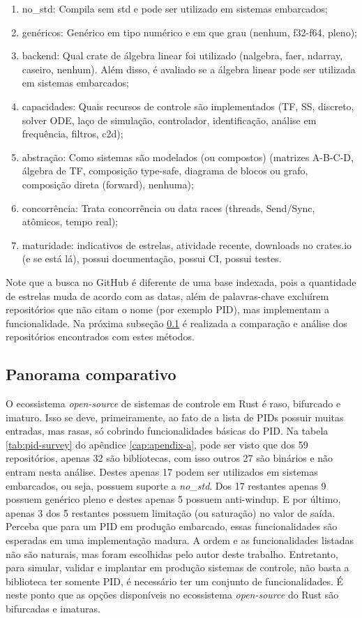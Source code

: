 \begin{enumerate}
  \item no\_std: Compila sem std e pode ser utilizado em sistemas embarcados;
  \item genéricos: Genérico em tipo numérico e em que grau (nenhum, f32-f64, pleno);
  \item backend: Qual crate de álgebra linear foi utilizado (nalgebra, faer, ndarray, caseiro, nenhum). Além disso, é avaliado se a álgebra linear pode ser utilizada em sistemas embarcados;
  \item capacidades: Quais recursos de controle são implementados (TF, SS, discreto, solver \ac{ODE}, laço de simulação, controlador, identificação, análise em frequência, filtros, c2d);
  \item abstração: Como sistemas são modelados (ou compostos) (matrizes A-B-C-D, álgebra de TF, composição type-safe, diagrama de blocos ou grafo, composição direta (forward), nenhuma);
  \item concorrência: Trata concorrência ou data races (threads, Send/Sync, atômicos, tempo real);
  \item maturidade: indicativos de estrelas, atividade recente, downloads no crates.io (e se está lá), possui documentação, possui \ac{CI}, possui testes.
\end{enumerate}

Note que a busca no GitHub é diferente de uma base indexada, pois a quantidade de estrelas muda de acordo com as datas, além de palavras-chave excluírem repositórios que não citam o nome (por exemplo \ac{PID}), mas implementam a funcionalidade. Na próxima subseção \ref{subsec:control-repos-table} é realizada a comparação e análise dos repositórios encontrados com estes métodos.

\subsection{Panorama comparativo}
\label{subsec:control-repos-table}

O ecossistema \textit{open-source} de sistemas de controle em Rust é raso, bifurcado e imaturo. Isso se deve, primeiramente, ao fato de a lista de \acp{PID} possuir muitas entradas, mas rasas, só cobrindo funcionalidades básicas do \ac{PID}. Na tabela \ref{tab:pid-survey} do apêndice \ref{cap:apendix-a}, pode ser visto que dos 59 repositórios, apenas 32 são bibliotecas, com isso outros 27 são binários e não entram nesta análise. Destes apenas 17 podem ser utilizados em sistemas embarcados, ou seja, possuem suporte a \textit{no\_std}. Dos 17 restantes apenas 9 possuem genérico pleno e destes apenas 5 possuem anti-windup. E por último, apenas 3 dos 5 restantes possuem limitação (ou saturação) no valor de saída. Perceba que para um \ac{PID} em produção embarcado, essas funcionalidades são esperadas em uma implementação madura. A ordem e as funcionalidades listadas não são naturais, mas foram escolhidas pelo autor deste trabalho. Entretanto, para simular, validar e implantar em produção sistemas de controle, não basta a biblioteca ter somente \ac{PID}, é necessário ter um conjunto de funcionalidades. É neste ponto que as opções disponíveis no ecossistema \textit{open-source} do Rust são bifurcadas e imaturas.

